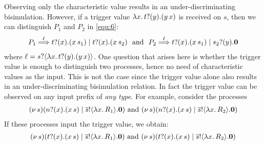 \begin{example}
Observing only the characteristic value 
results in an under-discriminating bisimulation.
However, if a trigger value
$\lambda {x}.\,t ? (y) . (y\, {{x}})$ 
is received on $s$, 
then we can distinguish $P_1$ and $P_2$ 
in \eqref{equ:6}:  
%
\begin{eqnarray*}
	P_1 \stackrel{\ell}{\Longrightarrow} t ? (x) . (x\, {s_1}) \;|\; 
t ? (x) . (x\, {s_2})
	\mbox{~~and~~}
	P_2 \stackrel{\ell}{\Longrightarrow} t ? (x) . (x\, {s_1}) \;|\; s_2 ? (y) . \mathbf{0} 
\end{eqnarray*}
\normalsize
%
\noi where 
$\ell = s?\langle \lambda {x}.\,t ? (y) . (y\, {{x}}) \rangle$.
One question that arises here is whether the trigger value is enough
to distinguish two processes, hence no need of 
characteristic values as the input. 
This is not the case since the trigger value
alone also results in an under-discriminating bisimulation relation.
In fact the  trigger value can be observed on any input prefix
of {\em any type}. For example, consider the processes
%
\begin{eqnarray}
\newsp{s}{\binp{n}{x} (\appl{x}{s}) \Par \bout{\dual{s}}{\abs{x} R_1} \inact} 
\ \mbox{and}\ 
\newsp{s}{\binp{n}{x} (\appl{x}{s}) \Par \bout{\dual{s}}{\abs{x} R_2} \inact} 
\label{equ:7}\label{equ:8}
\end{eqnarray}
%
\noi If these processes %
input the trigger value, we obtain: %
\begin{eqnarray*}
	(\nu\, s)(t ? (x) . (x\, {s}) \;|\; \overline{s} ! \langle \lambda x.\,R_1 \rangle . \mathbf{0}) 
	\mbox{ and }
	(\nu\, s)(t ? (x) . (x\, {s}) \;|\; \overline{s} ! \langle \lambda x.\,R_2 \rangle . \mathbf{0})
\end{eqnarray*}


\end{example}
